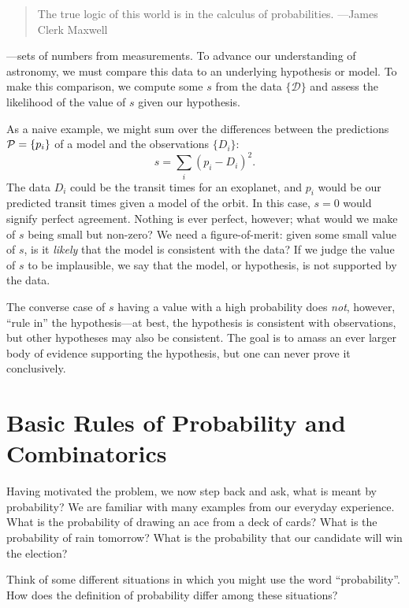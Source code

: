 
\begin{quote}The true logic of this world is  in the calculus of probabilities. ---James Clerk Maxwell\end{quote}

---sets of numbers from measurements. To advance our understanding of astronomy, we must compare this data to an underlying hypothesis or model.  To make this comparison, we compute some  $s$ from the data $\{\mathcal{D}\}$ and assess the likelihood of the value of $s$ given our hypothesis.

As a naive example, we might sum over the differences between the predictions $\mathcal{P} = \{p_{i}\}$ of a model and the observations $\{D_{i}\}$:
\[ s = \sum_{i} \left(p_{i}-D_{i}\right)^{2}. \]
The data $D_{i}$ could be the transit times for an exoplanet, and $p_{i}$ would be our predicted transit times given a model of the orbit.
In this case, $s=0$ would signify perfect agreement. Nothing is ever perfect, however; what would we make of $s$ being small but non-zero?  We need a figure-of-merit: given some small value of $s$, is it \emph{likely} that the model is consistent with the data?  If we judge the value of $s$ to be implausible, we say that the model, or hypothesis, is not supported by the data.  

The converse case of $s$ having a value with a high probability does \emph{not}, however, ``rule in'' the hypothesis---at best, the hypothesis is consistent with observations, but other hypotheses may also be consistent. The goal is to amass an ever larger body of evidence supporting the hypothesis, but one can never prove it conclusively.

\section{Basic Rules of Probability and Combinatorics}

Having motivated the problem, we now step back and ask, what is meant by probability? We are familiar with many examples from our everyday experience. What is the probability of drawing an ace from a deck of cards? What is the probability of rain tomorrow? What is the probability that our candidate will win the election?

\begin{exercisebox}
Think of some different situations in which you might use the word ``probability''.  How does the definition of probability differ among these situations?
\end{exercisebox}

